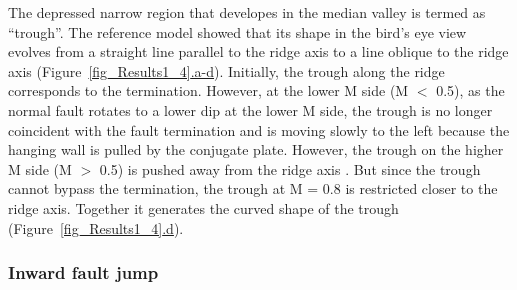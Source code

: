 The depressed narrow region that developes in the median valley is termed as ``trough''. The reference model showed that its shape in the bird's eye view evolves from a straight line parallel to the ridge axis to a line oblique to the ridge axis (Figure~\hyperref[fig_Results1_4]{\ref{fig_Results1_4}.a-d}). Initially, the trough along the ridge corresponds to the termination. However, at the lower M side (M $<$ 0.5), as the normal fault rotates to a lower dip at the lower M side, the trough is no longer coincident with the fault termination and is moving slowly to the left because the hanging wall is pulled by the conjugate plate. %
However, the trough on the higher M side (M $>$ 0.5) is pushed away from the ridge axis \citep{Tucholke2008}. But since the trough cannot bypass the termination, the trough at M = 0.8 is restricted closer to the ridge axis. Together it generates the curved shape of the trough (Figure~\hyperref[fig_Results1_4]{\ref{fig_Results1_4}.d}). 


\subsubsection{Inward fault jump}

